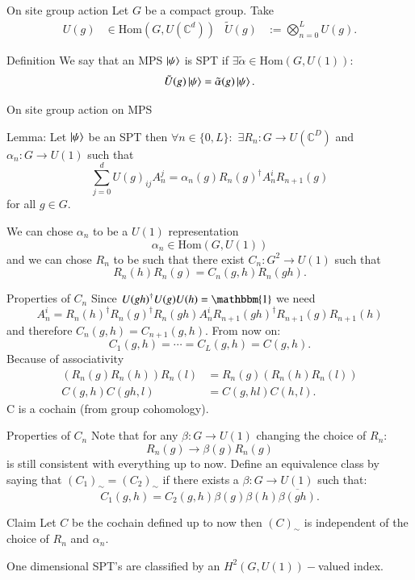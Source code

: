\documentclass{beamer}
\newcommand{\id}{\mathbbm{1}}
\newcommand{\CC}{\mathbb{C}}
\begin{document}
\begin{frame}{On site group action}
Let $G$ be a compact group. Take
\begin{align}
U(g)&\in\textrm{Hom}(G,U(\CC^d))&\tilde U(g)&:= \bigotimes_{n=0}^L U(g).
\end{align}
\pause
\begin{block}{Definition}
We say that an MPS $\ket{\psi}$ is SPT if $\exists \tilde{\alpha}\in\textrm{Hom}(G,U(1)):$
\[\tilde{U}(g)\ket{\psi}=\tilde{\alpha}(g)\ket{\psi}.\]
\end{block}
\end{frame}

\begin{frame}{On site group action on MPS}
\begin{block}{Lemma:}
Let $\ket{\psi}$ be an SPT then $\forall n\in\{0,L\}:$ $\exists R_n:G\rightarrow U(\CC^D)$ and $\alpha_n:G\rightarrow U(1)$ such that
\begin{equation}
\sum_{j=0}^{d}U(g)_{ij}A^j_n=\alpha_n(g) R_n(g)^\dagger A^i_n R_{n+1}(g)
\end{equation}
for all $g\in G.$
\end{block}
\pause
We can chose $\alpha_n$ to be a $U(1)$ representation
\[\alpha_n\in\textrm{Hom}(G,U(1))\]
\pause
and we can chose $R_n$ to be such that there exist $C_n:G^2\rightarrow U(1)$ such that
\[R_n(h)R_n(g)=C_n(g,h) R_n(gh).\]
\end{frame}

\begin{frame}{Properties of $C_n$}
Since $U(gh)^\dagger U(g)U(h)=\id$ we need
\begin{equation}
A_n^i=R_n(h)^\dagger R_n(g)^\dagger R_{n}(gh) A^i_n R_{n+1}(gh)^\dagger R_{n+1}(g) R_{n+1}(h)
\end{equation}
and therefore $C_n(g,h)=C_{n+1}(g,h)$. From now on:
\[C_1(g,h)=\cdots=C_L(g,h)=C(g,h).\]
\pause
Because of associativity
\begin{align*}
(R_n(g)R_n(h))R_n(l)&=R_n(g)(R_n(h)R_n(l))\\
C(g,h)C(gh,l)&=C(g,hl)C(h,l).
\end{align*}
C is a cochain (from group cohomology).
\end{frame}

\begin{frame}{Properties of $C_n$}
Note that for any $\beta:G\rightarrow U(1)$ changing the choice of $R_n:$
\[R_n(g)\rightarrow \beta(g)R_n(g)\]
is still consistent with everything up to now.
\pause
Define an equivalence class by saying that $(C_1)_{\sim}=(C_2)_{\sim}$ if there exists a $\beta:G\rightarrow U(1)$ such that:
\[C_1(g,h)=C_2(g,h)\beta(g)\beta(h)\overline{\beta(gh)}.\]
\pause
\begin{block}{Claim}
Let $C$ be the cochain defined up to now then $(C)_\sim$ is independent of the choice of $R_n$ and $\alpha_n$.
\end{block}
\pause
One dimensional SPT's are classified by an $H^2(G,U(1))-$valued index.
\end{frame}
\end{document}
